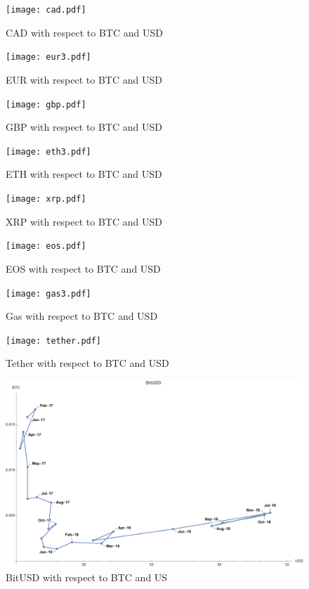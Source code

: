 
\begin{figure}[!htb]
	\texttt{[image: cad.pdf]}
	\caption{CAD with respect to BTC and USD}\label{fig:cad1}
	\endminipage\hfill
	\texttt{[image: eur3.pdf]}
	\caption{EUR with respect to BTC and USD}\label{fig:eur1}
	\endminipage\hfill
	\texttt{[image: gbp.pdf]}
	\caption{GBP with respect to BTC and USD}\label{fig:gbp1}
	\endminipage
\end{figure}

\begin{figure}[!htb]
	\texttt{[image: eth3.pdf]}
	\caption{ETH with respect to BTC and USD}\label{fig:cad1}
	\endminipage\hfill
	\texttt{[image: xrp.pdf]}
	\caption{XRP with respect to BTC and USD}\label{fig:eur1}
	\endminipage\hfill
	\texttt{[image: eos.pdf]}
	\caption{EOS with respect to BTC and USD}\label{fig:gbp1}
	\endminipage
\end{figure}

\begin{figure}[!htb]
	\texttt{[image: gas3.pdf]}
	\caption{Gas with respect to BTC and USD}\label{fig:cad1}
	\endminipage\hfill
	\texttt{[image: tether.pdf]}
	\caption{Tether with respect to BTC and USD}\label{fig:eur1}
	\endminipage\hfill
	\includegraphics[width=\linewidth]{figures/BitUSD_labled.pdf}
	\caption{BitUSD with respect to BTC and US}\label{fig:bitusd1}
	\endminipage\hfill
\end{figure}

